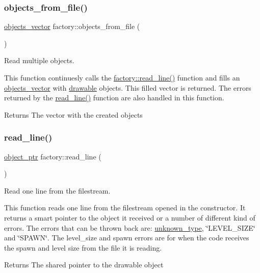\subsubsection{\texorpdfstring{objects\+\_\+from\+\_\+file()}{objects\_from\_file()}}
{\footnotesize\ttfamily \hyperlink{drawable_8hpp_a6c0fdb1dfd0c34dbbdbb5dcd3c608b07}{objects\+\_\+vector} factory\+::objects\+\_\+from\+\_\+file (\begin{DoxyParamCaption}{ }\end{DoxyParamCaption})}



Read multiple objects. 

This function continuesly calls the \hyperlink{classfactory_a82385866bc910c1b3a3e82d56487dd24}{factory\+::read\+\_\+line()} function and fills an \hyperlink{drawable_8hpp_a6c0fdb1dfd0c34dbbdbb5dcd3c608b07}{objects\+\_\+vector} with \hyperlink{classdrawable}{drawable} objects. This filled vector is returned. The errors returned by the \hyperlink{classfactory_a82385866bc910c1b3a3e82d56487dd24}{read\+\_\+line()} function are also handled in this function. \begin{DoxyReturn}{Returns}
The vector with the created objects 
\end{DoxyReturn}
\mbox{\label{classfactory_a82385866bc910c1b3a3e82d56487dd24}} 
\subsubsection{\texorpdfstring{read\+\_\+line()}{read\_line()}}
{\footnotesize\ttfamily \hyperlink{drawable_8hpp_aab5add95f06d2ba25dbfed8eb07274fa}{object\+\_\+ptr} factory\+::read\+\_\+line (\begin{DoxyParamCaption}{ }\end{DoxyParamCaption})}



Read one line from the filestream. 

This function reads one line from the filestream opened in the constructor. It returns a smart pointer to the object it received or a number of different kind of errors. The errors that can be thrown back are\+: \hyperlink{classunknown__type}{unknown\+\_\+type}, \char`\"{}\+L\+E\+V\+E\+L\+\_\+\+S\+I\+Z\+E\char`\"{} and \char`\"{}\+S\+P\+A\+W\+N\char`\"{}. The level\+\_\+size and spawn errors are for when the code receives the spawn and level size from the file it is reading. \begin{DoxyReturn}{Returns}
The shared pointer to the drawable object 
\end{DoxyReturn}
\mbox{\label{classfactory_af17f2a44d75cf8ccf712384341c2fcde}} 
